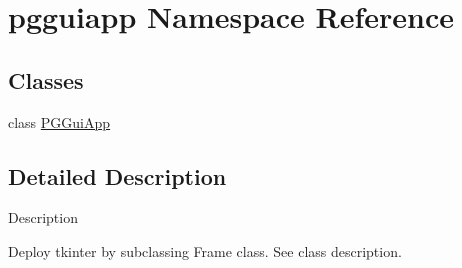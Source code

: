 \hypertarget{namespacepgguiapp}{}\section{pgguiapp Namespace Reference}
\label{namespacepgguiapp}
\subsection*{Classes}
\begin{DoxyCompactItemize}
\item 
class \hyperlink{classpgguiapp_1_1PGGuiApp}{P\+G\+Gui\+App}
\end{DoxyCompactItemize}


\subsection{Detailed Description}
\begin{DoxyVerb}Description

Deploy tkinter by subclassing Frame class.  See class description.
\end{DoxyVerb}
 